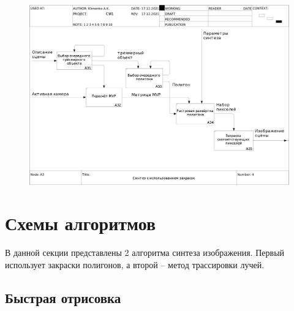 \begin{figure}
    \centering
    \includegraphics[width=\linewidth,height=0.85\textheight,keepaspectratio]{idef0/04_A3.jpg}
\end{figure}

\clearpage

\section{Схемы алгоритмов}

В данной секции представлены 2 алгоритма синтеза изображения. Первый использует закраски полигонов, а второй -- метод трассировки лучей.

\subsection{Быстрая отрисовка}

